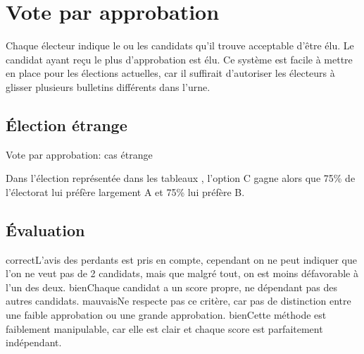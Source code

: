\documentclass[../report]{subfiles}
\begin{document}
  \section{Vote par approbation}

  Chaque électeur indique le ou les candidats qu'il trouve acceptable d'être élu.
  Le candidat ayant reçu le plus d'approbation est élu.
  Ce système est facile à mettre en place pour les élections actuelles, car il suffirait d'autoriser
  les électeurs à glisser plusieurs bulletins différents dans l'urne.

  \subsection{Élection étrange}

  \begin{table}[h]
    \begin{center}
      \caption{Vote par approbation: cas étrange}%
      \label{fig:diff:appro:caslim1}
    \end{center}
  \end{table}

  Dans l'élection représentée dans les tableaux , l'option
  C gagne alors que 75\% de l'électorat lui préfère largement A et 75\% lui préfère B.

  \subsection{Évaluation}
  \tabcritere%
    {correct}{L'avis des perdants est pris en compte, cependant on ne peut indiquer que l'on ne veut pas de 2 candidats, mais que malgré tout, on est moins défavorable à l'un des deux.}%
    {bien}{Chaque candidat a un score propre, ne dépendant pas des autres candidats.}%
    {mauvais}{Ne respecte pas ce critère, car pas de distinction entre une faible approbation ou une grande approbation.}%
    {bien}{Cette méthode est faiblement manipulable, car elle est clair et chaque score est parfaitement indépendant.}
\end{document}
